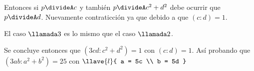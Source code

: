 Entonces si $p \divideA c$ y también $p \divideA c^2 + d^2$ debe ocurrir que
$p \divideA d$. Nuevamente contraticción ya que  debido a que $(c:d) = 1$.\par \medskip

El caso $\llamada3$ es lo mismo que el caso $\llamada2$.\par

Se concluye entonces que $(3cd : c^2 + d^2) = 1$ con $(c:d) = 1$.
Así probando que $(3ab : a^2 + b^2) = 25$ con
$\llave{l}{
    a = 5c \\
    b = 5d
  }$

\begin{aportes}
  \item {}
\end{aportes}
